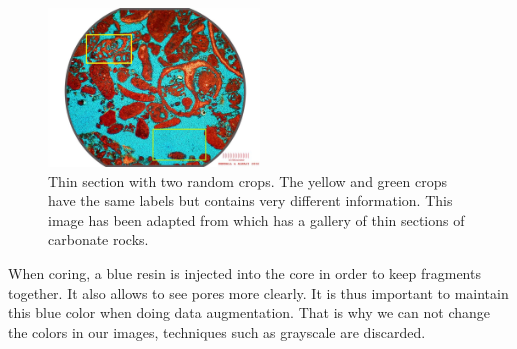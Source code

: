 \begin{figure}[h]
    \centering
        \includegraphics[width=0.5\textwidth]{figures/03-cropping_example_with2crops}
        \caption[Thin section with 2 random crops]{ Thin section with two random crops. The yellow and green crops have the same labels but contains very different information. This image has been adapted from \cite{section} which has a gallery of thin sections of carbonate rocks. }
        \label{fig:crops}
\end{figure}

When coring, a blue resin is injected into the core in order to keep fragments together. It also allows to see pores more clearly. It is thus important to maintain this blue color when doing data augmentation. That is why we can not change the colors in our images, techniques such as grayscale are discarded.


